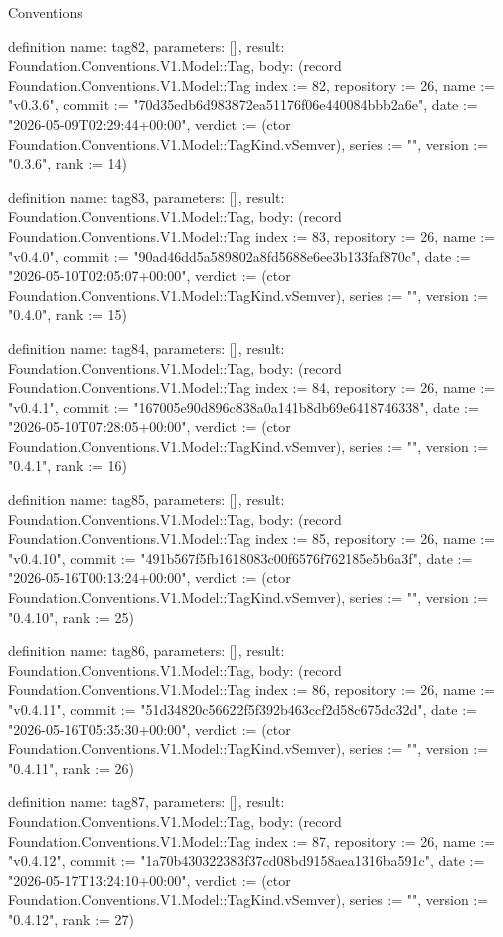\begin{lexlean}{Conventions}
\begin{semanticmodule}
definition{
  name: tag82,
  parameters: [],
  result: Foundation.Conventions.V1.Model::Tag,
  body: (record Foundation.Conventions.V1.Model::Tag {index := 82, repository := 26, name := "v0.3.6", commit := "70d35edb6d983872ea51176f06e440084bbb2a6e", date := "2026-05-09T02:29:44+00:00", verdict := (ctor Foundation.Conventions.V1.Model::TagKind.vSemver), series := "", version := "0.3.6", rank := 14})
}

definition{
  name: tag83,
  parameters: [],
  result: Foundation.Conventions.V1.Model::Tag,
  body: (record Foundation.Conventions.V1.Model::Tag {index := 83, repository := 26, name := "v0.4.0", commit := "90ad46dd5a589802a8fd5688e6ee3b133faf870c", date := "2026-05-10T02:05:07+00:00", verdict := (ctor Foundation.Conventions.V1.Model::TagKind.vSemver), series := "", version := "0.4.0", rank := 15})
}

definition{
  name: tag84,
  parameters: [],
  result: Foundation.Conventions.V1.Model::Tag,
  body: (record Foundation.Conventions.V1.Model::Tag {index := 84, repository := 26, name := "v0.4.1", commit := "167005e90d896c838a0a141b8db69e6418746338", date := "2026-05-10T07:28:05+00:00", verdict := (ctor Foundation.Conventions.V1.Model::TagKind.vSemver), series := "", version := "0.4.1", rank := 16})
}

definition{
  name: tag85,
  parameters: [],
  result: Foundation.Conventions.V1.Model::Tag,
  body: (record Foundation.Conventions.V1.Model::Tag {index := 85, repository := 26, name := "v0.4.10", commit := "491b567f5fb1618083c00f6576f762185e5b6a3f", date := "2026-05-16T00:13:24+00:00", verdict := (ctor Foundation.Conventions.V1.Model::TagKind.vSemver), series := "", version := "0.4.10", rank := 25})
}

definition{
  name: tag86,
  parameters: [],
  result: Foundation.Conventions.V1.Model::Tag,
  body: (record Foundation.Conventions.V1.Model::Tag {index := 86, repository := 26, name := "v0.4.11", commit := "51d34820c56622f5f392b463ccf2d58c675dc32d", date := "2026-05-16T05:35:30+00:00", verdict := (ctor Foundation.Conventions.V1.Model::TagKind.vSemver), series := "", version := "0.4.11", rank := 26})
}

definition{
  name: tag87,
  parameters: [],
  result: Foundation.Conventions.V1.Model::Tag,
  body: (record Foundation.Conventions.V1.Model::Tag {index := 87, repository := 26, name := "v0.4.12", commit := "1a70b430322383f37cd08bd9158aea1316ba591c", date := "2026-05-17T13:24:10+00:00", verdict := (ctor Foundation.Conventions.V1.Model::TagKind.vSemver), series := "", version := "0.4.12", rank := 27})
}


\end{semanticmodule}
\end{lexlean}
